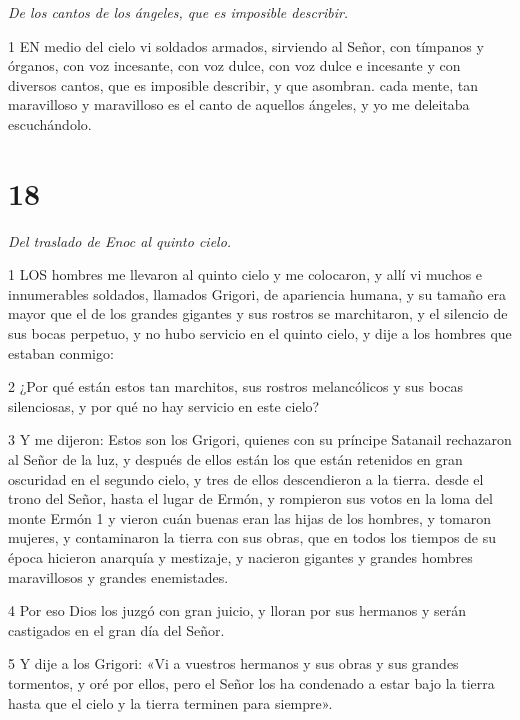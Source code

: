 \par \textit{De los cantos de los ángeles, que es imposible describir.}

\par 1 EN medio del cielo vi soldados armados, sirviendo al Señor, con tímpanos y órganos, con voz incesante, con voz dulce, con voz dulce e incesante y con diversos cantos, que es imposible describir, y que asombran. cada mente, tan maravilloso y maravilloso es el canto de aquellos ángeles, y yo me deleitaba escuchándolo.

\chapter{18}

\par \textit{Del traslado de Enoc al quinto cielo.}

\par 1 LOS hombres me llevaron al quinto cielo y me colocaron, y allí vi muchos e innumerables soldados, llamados Grigori, de apariencia humana, y su tamaño era mayor que el de los grandes gigantes y sus rostros se marchitaron, y el silencio de sus bocas perpetuo, y no hubo servicio en el quinto cielo, y dije a los hombres que estaban conmigo:

\par 2 ¿Por qué están estos tan marchitos, sus rostros melancólicos y sus bocas silenciosas, y por qué no hay servicio en este cielo?

\par 3 Y me dijeron: Estos son los Grigori, quienes con su príncipe Satanail rechazaron al Señor de la luz, y después de ellos están los que están retenidos en gran oscuridad en el segundo cielo, y tres de ellos descendieron a la tierra. desde el trono del Señor, hasta el lugar de Ermón, y rompieron sus votos en la loma del monte Ermón 1 y vieron cuán buenas eran las hijas de los hombres, y tomaron mujeres, y contaminaron la tierra con sus obras, que en todos los tiempos de su época hicieron anarquía y mestizaje, y nacieron gigantes y grandes hombres maravillosos y grandes enemistades.

\par 4 Por eso Dios los juzgó con gran juicio, y lloran por sus hermanos y serán castigados en el gran día del Señor.

\par 5 Y dije a los Grigori: «Vi a vuestros hermanos y sus obras y sus grandes tormentos, y oré por ellos, pero el Señor los ha condenado a estar bajo la tierra hasta que el cielo y la tierra terminen para siempre».


